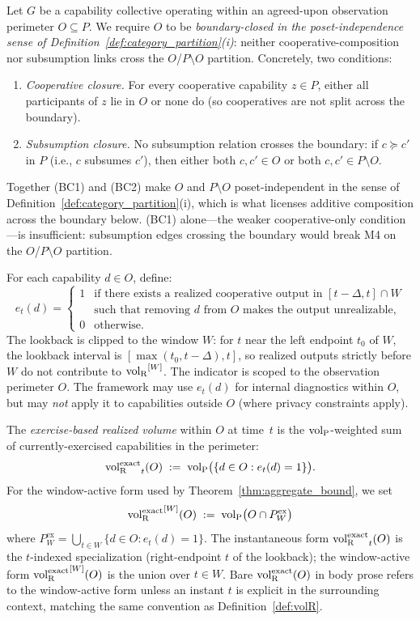 \begin{definition}
\label{def:exercise_indicator}
Let $G$ be a capability collective operating within an
agreed-upon observation perimeter $O \subseteq P$.  We require
$O$ to be \emph{boundary-closed in the poset-independence sense
of Definition~\ref{def:category_partition}(i)}: neither
cooperative-composition nor subsumption links cross the
$O$/$P \setminus O$ partition.  Concretely, two conditions:
\begin{enumerate}
\item[(BC1)] \emph{Cooperative closure.}  For every cooperative
  capability $z \in P$, either all participants of $z$ lie in
  $O$ or none do (so cooperatives are not split across the
  boundary).
\item[(BC2)] \emph{Subsumption closure.}  No subsumption
  relation crosses the boundary: if $c \succeq c'$ in $P$ (i.e.,
  $c$ subsumes $c'$), then either both $c, c' \in O$ or both
  $c, c' \in P \setminus O$.
\end{enumerate}
Together (BC1) and (BC2) make $O$ and $P \setminus O$
poset-independent in the sense of
Definition~\ref{def:category_partition}(i), which is what
licenses additive composition across the boundary below.  (BC1)
alone---the weaker cooperative-only condition---is insufficient:
subsumption edges crossing the boundary would break M4 on the
$O$/$P \setminus O$ partition.

For each capability $d \in O$, define:
\[
  e_t(d) = \begin{cases}
  1 & \text{if there exists a realized cooperative output in
    $[t - \Delta, t] \cap W$} \\
    & \text{such that removing $d$ from $O$ makes the output
      unrealizable,} \\
  0 & \text{otherwise.}
  \end{cases}
\]
The lookback is clipped to the window $W$: for $t$ near the
left endpoint $t_0$ of $W$, the lookback interval is
$[\max(t_0, t - \Delta), t]$, so realized outputs strictly
before $W$ do not contribute to ${\operatorname{vol}_{\mathrm{R}}}^{[W]}$.
The indicator is scoped to the observation perimeter $O$.  The
framework may use $e_t(d)$ for internal diagnostics within $O$,
but may \emph{not} apply it to capabilities outside $O$ (where
privacy constraints apply).

The \emph{exercise-based realized volume} within $O$ at
time~$t$ is the ${\operatorname{vol}_{\mathrm{P}}}$-weighted sum of currently-exercised
capabilities in the perimeter:
\[
  {\operatorname{vol}_{\mathrm{R}}^{\mathrm{exact}}}_t(O) \;:=\;
  {\operatorname{vol}_{\mathrm{P}}}\bigl(\{d \in O : e_t(d) = 1\}\bigr).
\]
For the window-active form used by
Theorem~\ref{thm:aggregate_bound}, we set
\[
  {\operatorname{vol}_{\mathrm{R}}^{\mathrm{exact}}}^{[W]}(O) \;:=\;
  {\operatorname{vol}_{\mathrm{P}}}\bigl(O \cap P^{\mathrm{ex}}_W\bigr)
\]
where $P^{\mathrm{ex}}_W = \bigcup_{t \in W} \{d \in O : e_t(d)
= 1\}$.  The instantaneous form ${\operatorname{vol}_{\mathrm{R}}^{\mathrm{exact}}}_t(O)$ is the
$t$-indexed specialization (right-endpoint $t$ of the lookback);
the window-active form ${\operatorname{vol}_{\mathrm{R}}^{\mathrm{exact}}}^{[W]}(O)$ is the union over
$t \in W$.  Bare ${\operatorname{vol}_{\mathrm{R}}^{\mathrm{exact}}}(O)$ in body prose refers to the
window-active form unless an instant $t$ is explicit in the
surrounding context, matching the same convention as
Definition~\ref{def:volR}.
\end{definition}

